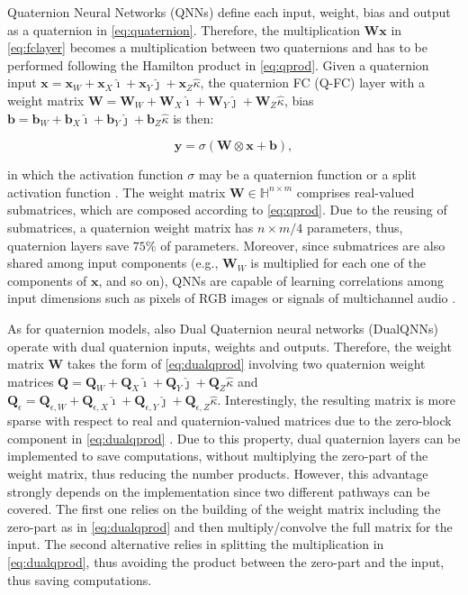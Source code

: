 \documentclass[3p, preprint, twocolumn]{elsarticle}
\def\x{{\mathbf x}}														\def\q{{\mathbf q}}														\def\p{{\mathbf p}}														\def\y{{\mathbf y}}														\def\z{{\mathbf z}}														\def\C{{\mathbf C}}														\def\E{\text{E}} 									\def\W{{\mathbf W}}														\def\ii{{\hat{\imath}}}												\def\ij{{\hat{\jmath}}}												\def\ik{{\hat{\kappa}}}												\def\bH{\mathbb{H}}														\def\bQ{\mathbb{Q}}														\def\bR{\mathbb{R}}														\def\cD{{\cal D}}															\def\cL{{\cal L}}															\def\cN{{\cal N}}
\begin{document}
Quaternion Neural Networks (QNNs) define each input, weight, bias and output as a quaternion in \eqref{eq:quaternion}. Therefore, the multiplication $\mathbf{W}\mathbf{x}$ in \eqref{eq:fclayer} becomes a multiplication between two quaternions and has to be performed following the Hamilton product in \eqref{eq:qprod}. Given a quaternion input $\mathbf{x} = \mathbf{x}_W + \mathbf{x}_X \ii + \mathbf{x}_Y \ij + \mathbf{x}_Z \ik$, the quaternion FC (Q-FC) layer with a weight matrix $\W = \W_W + \W_X \ii + \W_Y \ij + \W_Z \ik$, bias $\mathbf{b} = \mathbf{b}_W + \mathbf{b}_X \ii + \mathbf{b}_Y \ij + \mathbf{b}_Z \ik$ is then:

\begin{equation}
    \mathbf{y} = \sigma(\mathbf{W} \otimes \mathbf{x} + \mathbf{b}),
\end{equation}

\noindent in which the activation function $\sigma$ may be a quaternion function or a split activation function \cite{GrassucciQGAN2021}. The weight matrix $\W \in \bH^{n \times m}$ comprises real-valued submatrices, which are composed according to \eqref{eq:qprod}. Due to the reusing of submatrices, a quaternion weight matrix has $n \times m /4$ parameters, thus, quaternion layers save $75\%$ of parameters. Moreover, since submatrices are also shared among input components (e.g., $\W_W$ is multiplied for each one of the components of $\x$, and so on), QNNs are capable of learning correlations among input dimensions such as pixels of RGB images or signals of multichannel audio \cite{ComminielloICASSP2019b}.

As for quaternion models, also Dual Quaternion neural networks (DualQNNs) operate with dual quaternion inputs, weights and outputs. Therefore, the weight matrix $\W$ takes the form of \eqref{eq:dualqprod} involving two quaternion weight matrices $\mathbf{Q} = \mathbf{Q}_W + \mathbf{Q}_X \ii + \mathbf{Q}_Y \ij + \mathbf{Q}_Z \ik$ and $\mathbf{Q}_{\epsilon} = \mathbf{Q}_{\epsilon,W} + \mathbf{Q}_{\epsilon,X} \ii + \mathbf{Q}_{\epsilon,Y} \ij + \mathbf{Q}_{\epsilon,Z} \ik$. Interestingly, the resulting matrix is more sparse with respect to real and quaternion-valued matrices due to the zero-block component in \eqref{eq:dualqprod} \cite{Schwung2021RigidBody}. Due to this property, dual quaternion layers can be implemented to save computations, without multiplying the zero-part of the weight matrix, thus reducing the number products. However, this advantage strongly depends on the implementation since two different pathways can be covered. The first one relies on the building of the weight matrix including the zero-part as in \eqref{eq:dualqprod} and then multiply/convolve the full matrix for the input. The second alternative relies in splitting the multiplication in \eqref{eq:dualqprod}, thus avoiding the product between the zero-part and the input, thus saving computations.
\end{document}
